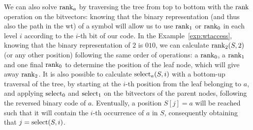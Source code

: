 \documentclass[a4paper,10pt,twoside]{book}
\begin{document}
    We can also solve $\operatorname{rank}_a$ by traversing the tree from top to bottom with the $\operatorname{rank}$ operation on the bitvectors: knowing that the binary representation (and thus also the path in the \gls{wt}) of a symbol will allow us to use $\operatorname{rank}_1$ or $\operatorname{rank}_0$ in each level $i$ according to the $i$-th bit of our code. In the Example~\ref{exp:wtaccess}, knowing that the binary representation of $2$ is $010$, we can calculate $\operatorname{rank}_2(S,2)$ (or any other position) following the same order of operations: a $\operatorname{rank}_0$, a $\operatorname{rank}_1$ and one final $\operatorname{rank}_0$ to determine the position of the leaf node, which will give away $\operatorname{rank}_2$. It is also possible to calculate $\operatorname{select}_a(S,i)$ with a bottom-up traversal of the tree, by starting at the $i$-th position from the leaf belonging to $a$, and applying $\operatorname{select}_0$ and $\operatorname{select}_1$ on the bitvectors of the parent nodes, following the reversed binary code of $a$. Eventually, a position $S[j]=a$ will be reached such that it will contain the $i$-th occurrence of $a$ in $S$, consequently obtaining that $j=\operatorname{select}(S,i)$.
    
\end{document}
